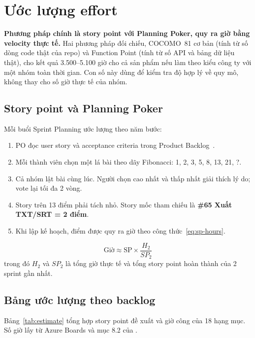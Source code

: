 \documentclass[12pt,a4paper]{report}
\begin{document}
\chapter{Ước lượng effort}
\label{chap:effort}

\textbf{Phương pháp chính là story point với Planning Poker, quy ra giờ bằng velocity thực tế.} Hai phương pháp
đối chiếu, COCOMO~81 cơ bản (tính từ số dòng code thật của repo) và Function Point (tính từ số API và bảng dữ liệu
thật), cho kết quả 3.500--5.100 giờ cho cả sản phẩm nếu làm theo kiểu công ty với một nhóm toàn thời gian. Con số
này dùng để kiểm tra độ hợp lý về quy mô, không thay cho số giờ thực tế của nhóm.

\section{Story point và Planning Poker}

Mỗi buổi Sprint Planning ước lượng theo năm bước:
\begin{enumerate}
  \item PO đọc user story và acceptance criteria trong Product Backlog~\cite{srs}.
  \item Mỗi thành viên chọn một lá bài theo dãy Fibonacci: 1, 2, 3, 5, 8, 13, 21, ?.
  \item Cả nhóm lật bài cùng lúc. Người chọn cao nhất và thấp nhất giải thích lý do; vote lại tối đa 2 vòng.
  \item Story trên 13 điểm phải tách nhỏ. Story mốc tham chiếu là \textbf{\#65 Xuất TXT/SRT = 2 điểm}.
  \item Khi lập kế hoạch, điểm được quy ra giờ theo công thức~\eqref{eq:sp-hours}.
\end{enumerate}
\begin{equation}
  \label{eq:sp-hours}
  \text{Giờ} \approx \text{SP} \times \frac{H_2}{\mathit{SP}_2}
\end{equation}
trong đó $H_2$ và $\mathit{SP}_2$ là tổng giờ thực tế và tổng story point hoàn thành của 2 sprint gần nhất.

\section{Bảng ước lượng theo backlog}

Bảng~\ref{tab:estimate} tổng hợp story point đề xuất và giờ công của 18 hạng mục. Số giờ lấy từ Azure Boards
và mục 8.2 của .
\end{document}
